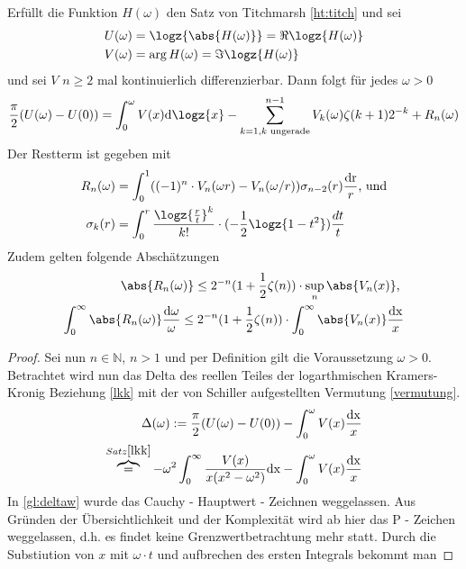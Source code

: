 \begin{satz}
Erfüllt die Funktion $H(\omega)$ den Satz von Titchmarsh \ref{ht:titch} und sei 
\begin{align}
U(\omega) &= \logz{\abs{H(\omega)}} = \Re{\logz{H(\omega)}}\\
V(\omega) &= \arg{H(\omega)} = \Im{\logz{H(\omega)}}
\end{align}
und sei $V$ $n \geq 2$ mal kontinuierlich differenzierbar. Dann folgt für jedes $\omega > 0$
\begin{align}
	\frac{\pi}{2}(U(\omega) - U(0)) =  \int_0^{\omega} V(x) \mathrm{d} \logz{x}  - \sum_{k=1, k \text{ ungerade}}^{n-1} V_k(\omega) \zeta(k+1) 2^{-k} + R_n(\omega)
\end{align}
Der Restterm ist gegeben mit 
\begin{align}
	R_n(\omega) &= \int_0^1 ((-1)^n \cdot V_n(\omega r) - V_n(\omega/r) ) \sigma_{n-2}(r) \frac{\mathrm{dr}}{r}\text{, und}\label{gl:Rest1}\\ 
	\sigma_k(r) &= \int_0^r \frac{\logz{\frac{r}{t}}^k}{k!} \cdot (-\frac{1}{2} \logz{1-t^2})\frac{dt}{t}
\end{align}
Zudem gelten folgende Abschätzungen
\begin{align}
\abs{R_n(\omega)} \leq 2^{-n} (1 + \frac{1}{2	} \zeta(n))\cdot \sup_n{\abs{V_n(x)}} \text{, }\\ 
\int_0^{\infty} \abs{R_n(\omega)} \frac{\mathrm{d\omega}}{\omega} \leq 2^{-n} (1 + \frac{1}{2	} \zeta(n))\cdot \int_0^{\infty} \abs{V_n(x)} \frac{\mathrm{dx}}{x}
\end{align}
\begin{proof}
Sei nun $n \in \mathbb{N}$, $n > 1$ und per Definition gilt die Voraussetzung $\omega > 0$. Betrachtet wird nun das Delta des reellen Teiles der logarthmischen Kramers-Kronig Beziehung \ref{lkk} mit der von Schiller aufgestellten Vermutung \ref{vermutung}.
\begin{align}
	\Delta(\omega) := \frac{\pi}{2}(U(\omega) - U(0)) - \int_0^{\omega} V(x) \frac{\mathrm{dx}}{x}\\
	\overbrace{=}^{Satz \ref{lkk}} -\omega^2 \int_0^{\infty} \frac{V(x)}{x(x^2-\omega^2)} \mathrm{dx} - \int_0^{\omega} V(x) \frac{\mathrm{dx}}{x} \label{gl:deltaw}
\end{align}
In \ref{gl:deltaw} wurde das Cauchy - Hauptwert - Zeichnen weggelassen. Aus Gründen der Übersichtlichkeit und der Komplexität wird ab hier das P - Zeichen weggelassen, d.h. es findet keine Grenzwertbetrachtung mehr statt. Durch die Substiution von $x$ mit $\omega \cdot t$ und aufbrechen des ersten Integrals bekommt man

\end{proof}
\end{satz}

